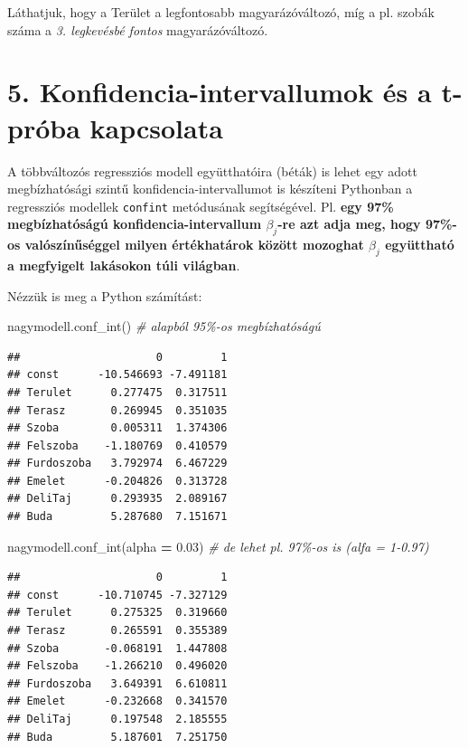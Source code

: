 \documentclass[
]{book}
\newenvironment{Shaded}{\begin{snugshade}}{\end{snugshade}}
\newcommand{\CommentTok}[1]{\textcolor[rgb]{0.56,0.35,0.01}{\textit{#1}}}
\newcommand{\FloatTok}[1]{\textcolor[rgb]{0.00,0.00,0.81}{#1}}
\newcommand{\NormalTok}[1]{#1}
\newcommand{\OperatorTok}[1]{\textcolor[rgb]{0.81,0.36,0.00}{\textbf{#1}}}
\begin{document}
Láthatjuk, hogy a Terület a legfontosabb magyarázóváltozó, míg a pl. szobák száma a \emph{3. legkevésbé fontos} magyarázóváltozó.

\section{5. Konfidencia-intervallumok és a t-próba kapcsolata}\label{konfidencia-intervallumok-uxe9s-a-t-pruxf3ba-kapcsolata}

A többváltozós regressziós modell együtthatóira (béták) is lehet egy adott megbízhatósági szintű konfidencia-intervallumot is készíteni Pythonban a regressziós modellek \texttt{confint} metódusának segítségével.
Pl. \textbf{egy 97\% megbízhatóságú konfidencia-intervallum \(\beta_j\)-re azt adja meg, hogy 97\%-os valószínűséggel milyen értékhatárok között mozoghat \(\beta_j\) együttható a megfyigelt lakásokon túli világban}.

Nézzük is meg a Python számítást:

\begin{Shaded}
\begin{Highlighting}[]
\NormalTok{nagymodell.conf\_int() }\CommentTok{\# alapból 95\%{-}os megbízhatóságú}
\end{Highlighting}
\end{Shaded}

\begin{verbatim}
##                     0         1
## const      -10.546693 -7.491181
## Terulet      0.277475  0.317511
## Terasz       0.269945  0.351035
## Szoba        0.005311  1.374306
## Felszoba    -1.180769  0.410579
## Furdoszoba   3.792974  6.467229
## Emelet      -0.204826  0.313728
## DeliTaj      0.293935  2.089167
## Buda         5.287680  7.151671
\end{verbatim}

\begin{Shaded}
\begin{Highlighting}[]
\NormalTok{nagymodell.conf\_int(alpha }\OperatorTok{=} \FloatTok{0.03}\NormalTok{) }\CommentTok{\# de lehet pl. 97\%{-}os is (alfa = 1{-}0.97)}
\end{Highlighting}
\end{Shaded}

\begin{verbatim}
##                     0         1
## const      -10.710745 -7.327129
## Terulet      0.275325  0.319660
## Terasz       0.265591  0.355389
## Szoba       -0.068191  1.447808
## Felszoba    -1.266210  0.496020
## Furdoszoba   3.649391  6.610811
## Emelet      -0.232668  0.341570
## DeliTaj      0.197548  2.185555
## Buda         5.187601  7.251750
\end{verbatim}
\end{document}
